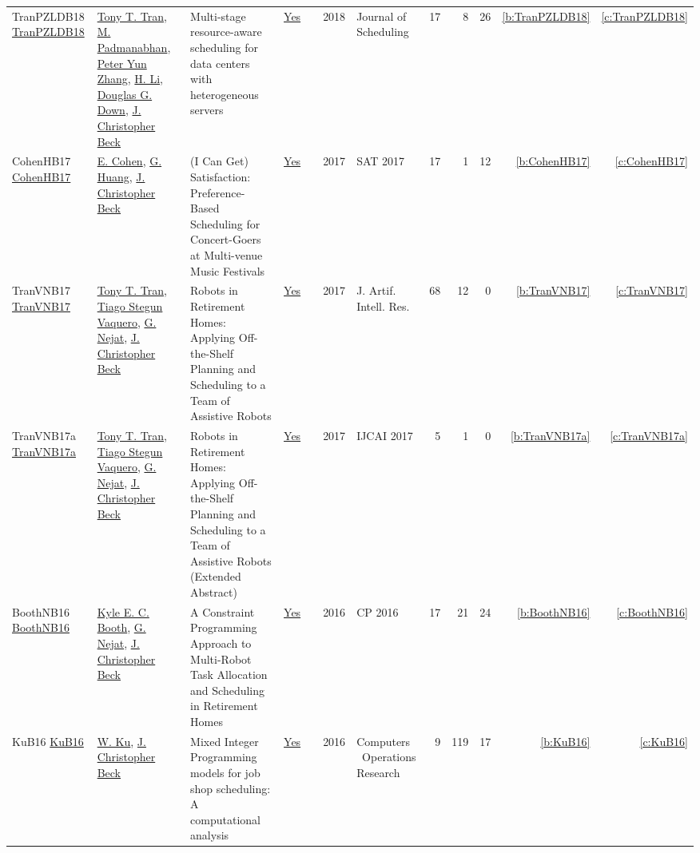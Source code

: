 {\begin{longtable}{>{\raggedright\arraybackslash}p{3cm}>{\raggedright\arraybackslash}p{6cm}>{\raggedright\arraybackslash}p{6.5cm}rrrp{2.5cm}rrrrr}
TranPZLDB18 \href{https://doi.org/10.1007/s10951-017-0537-x}{TranPZLDB18} & \hyperref[auth:a811]{Tony T. Tran}, \hyperref[auth:a812]{M. Padmanabhan}, \hyperref[auth:a813]{Peter Yun Zhang}, \hyperref[auth:a814]{H. Li}, \hyperref[auth:a815]{Douglas G. Down}, \hyperref[auth:a89]{J. Christopher Beck} & Multi-stage resource-aware scheduling for data centers with heterogeneous servers & \href{../works/TranPZLDB18.pdf}{Yes} & \cite{TranPZLDB18} & 2018 & Journal of Scheduling & 17 & 8 & 26 & \ref{b:TranPZLDB18} & \ref{c:TranPZLDB18}\\
CohenHB17 \href{https://doi.org/10.1007/978-3-319-66263-3\_10}{CohenHB17} & \hyperref[auth:a817]{E. Cohen}, \hyperref[auth:a818]{G. Huang}, \hyperref[auth:a89]{J. Christopher Beck} & {(I} Can Get) Satisfaction: Preference-Based Scheduling for Concert-Goers at Multi-venue Music Festivals & \href{../works/CohenHB17.pdf}{Yes} & \cite{CohenHB17} & 2017 & SAT 2017 & 17 & 1 & 12 & \ref{b:CohenHB17} & \ref{c:CohenHB17}\\
TranVNB17 \href{https://doi.org/10.1613/jair.5306}{TranVNB17} & \hyperref[auth:a811]{Tony T. Tran}, \hyperref[auth:a816]{Tiago Stegun Vaquero}, \hyperref[auth:a210]{G. Nejat}, \hyperref[auth:a89]{J. Christopher Beck} & Robots in Retirement Homes: Applying Off-the-Shelf Planning and Scheduling to a Team of Assistive Robots & \href{../works/TranVNB17.pdf}{Yes} & \cite{TranVNB17} & 2017 & J. Artif. Intell. Res. & 68 & 12 & 0 & \ref{b:TranVNB17} & \ref{c:TranVNB17}\\
TranVNB17a \href{https://doi.org/10.24963/ijcai.2017/726}{TranVNB17a} & \hyperref[auth:a811]{Tony T. Tran}, \hyperref[auth:a816]{Tiago Stegun Vaquero}, \hyperref[auth:a210]{G. Nejat}, \hyperref[auth:a89]{J. Christopher Beck} & Robots in Retirement Homes: Applying Off-the-Shelf Planning and Scheduling to a Team of Assistive Robots (Extended Abstract) & \href{../works/TranVNB17a.pdf}{Yes} & \cite{TranVNB17a} & 2017 & IJCAI 2017 & 5 & 1 & 0 & \ref{b:TranVNB17a} & \ref{c:TranVNB17a}\\
BoothNB16 \href{https://doi.org/10.1007/978-3-319-44953-1\_34}{BoothNB16} & \hyperref[auth:a209]{Kyle E. C. Booth}, \hyperref[auth:a210]{G. Nejat}, \hyperref[auth:a89]{J. Christopher Beck} & A Constraint Programming Approach to Multi-Robot Task Allocation and Scheduling in Retirement Homes & \href{../works/BoothNB16.pdf}{Yes} & \cite{BoothNB16} & 2016 & CP 2016 & 17 & 21 & 24 & \ref{b:BoothNB16} & \ref{c:BoothNB16}\\
KuB16 \href{https://doi.org/10.1016/j.cor.2016.04.006}{KuB16} & \hyperref[auth:a337]{W. Ku}, \hyperref[auth:a89]{J. Christopher Beck} & Mixed Integer Programming models for job shop scheduling: {A} computational analysis & \href{../works/KuB16.pdf}{Yes} & \cite{KuB16} & 2016 & Computers \  Operations Research & 9 & 119 & 17 & \ref{b:KuB16} & \ref{c:KuB16}\\

\end{longtable}}
